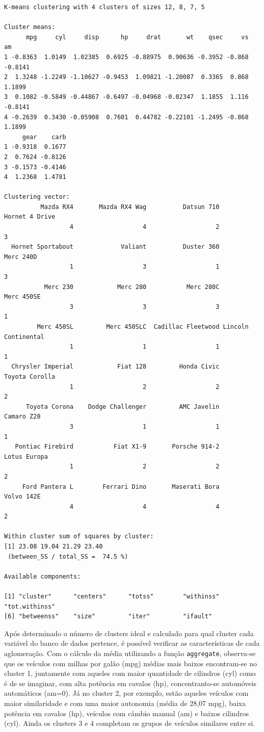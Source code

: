 \documentclass[12pt,brazil,oneside]{book}
\begin{document}
\begin{verbatim}
K-means clustering with 4 clusters of sizes 12, 8, 7, 5

Cluster means:
      mpg     cyl     disp      hp     drat       wt    qsec     vs      am
1 -0.8363  1.0149  1.02385  0.6925 -0.88975  0.90636 -0.3952 -0.868 -0.8141
2  1.3248 -1.2249 -1.10627 -0.9453  1.09821 -1.20087  0.3365  0.868  1.1899
3  0.1082 -0.5849 -0.44867 -0.6497 -0.04968 -0.02347  1.1855  1.116 -0.8141
4 -0.2639  0.3430 -0.05908  0.7601  0.44782 -0.22101 -1.2495 -0.868  1.1899
     gear    carb
1 -0.9318  0.1677
2  0.7624 -0.8126
3 -0.1573 -0.4146
4  1.2368  1.4781

Clustering vector:
          Mazda RX4       Mazda RX4 Wag          Datsun 710      Hornet 4 Drive 
                  4                   4                   2                   3 
  Hornet Sportabout             Valiant          Duster 360           Merc 240D 
                  1                   3                   1                   3 
           Merc 230            Merc 280           Merc 280C          Merc 450SE 
                  3                   3                   3                   1 
         Merc 450SL         Merc 450SLC  Cadillac Fleetwood Lincoln Continental 
                  1                   1                   1                   1 
  Chrysler Imperial            Fiat 128         Honda Civic      Toyota Corolla 
                  1                   2                   2                   2 
      Toyota Corona    Dodge Challenger         AMC Javelin          Camaro Z28 
                  3                   1                   1                   1 
   Pontiac Firebird           Fiat X1-9       Porsche 914-2        Lotus Europa 
                  1                   2                   2                   2 
     Ford Pantera L        Ferrari Dino       Maserati Bora          Volvo 142E 
                  4                   4                   4                   2 

Within cluster sum of squares by cluster:
[1] 23.08 19.04 21.29 23.40
 (between_SS / total_SS =  74.5 %)

Available components:

[1] "cluster"      "centers"      "totss"        "withinss"     "tot.withinss"
[6] "betweenss"    "size"         "iter"         "ifault"      
\end{verbatim}

Após determinado o número de clusters ideal e calculado para qual cluster cada variável do banco de dados pertence, é possível verificar as características de cada aglomeração. Com o cálculo da média utilizando a função \texttt{aggregate}, observa-se que os veículos com milhas por galão (mpg) médias mais baixos encontram-se no cluster 1, juntamente com aqueles com maior quantidade de cilindros (cyl) como é de se imaginar, com alta potência em cavalos (hp), concentranto-se automóveis automáticos (am=0). Já no cluster 2, por exemplo, estão aqueles veículos com maior similaridade e com uma maior autonomia (média de 28,07 mpg), baixa potência em cavalos (hp), veículos com câmbio manual (am) e baixos cilindros (cyl). Ainda os clusters 3 e 4 completam os grupos de veículos similares entre si.
\end{document}
